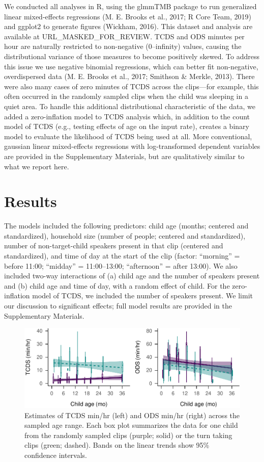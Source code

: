 \documentclass[,man,floatsintext]{apa6}
\begin{document}
We conducted all analyses in R, using the glmmTMB package to run
generalized linear mixed-effects regressions (M. E. Brooks et al., 2017;
R Core Team, 2019) and ggplot2 to generate figures (Wickham, 2016). This
dataset and analysis are available at URL\_MASKED\_FOR\_REVIEW. TCDS and
ODS minutes per hour are naturally restricted to non-negative
(0--infinity) values, causing the distributional variance of those
measures to become positively skewed. To address this issue we use
negative binomial regressions, which can better fit non-negative,
overdispersed data (M. E. Brooks et al., 2017; Smithson \& Merkle,
2013). There were also many cases of zero minutes of TCDS across the
clips---for example, this often occurred in the randomly sampled clips
when the child was sleeping in a quiet area. To handle this additional
distributional characteristic of the data, we added a zero-inflation
model to TCDS analysis which, in addition to the count model of TCDS
(e.g., testing effects of age on the input rate), creates a binary model
to evaluate the likelihood of TCDS being used at all. More conventional,
gaussian linear mixed-effects regressions with log-transformed dependent
variables are provided in the Supplementary Materials, but are
qualitatively similar to what we report here.

\section{Results}\label{results}

The models included the following predictors: child age (months;
centered and standardized), household size (number of people; centered
and standardized), number of non-target-child speakers present in that
clip (centered and standardized), and time of day at the start of the
clip (factor: \enquote{morning} = before 11:00; \enquote{midday} =
11:00--13:00; \enquote{afternoon} = after 13:00). We also included
two-way interactions of (a) child age and the number of speakers present
and (b) child age and time of day, with a random effect of child. For
the zero-inflation model of TCDS, we included the number of speakers
present. We limit our discussion to significant effects; full model
results are provided in the Supplementary Materials.

\begin{figure}
\centering
\includegraphics{Yeli-CLE_files/figure-latex/fig2-1.pdf}
\caption{\label{fig:fig2}Estimates of TCDS min/hr (left) and ODS min/hr
(right) across the sampled age range. Each box plot summarizes the data
for one child from the randomly sampled clips (purple; solid) or the
turn taking clips (green; dashed). Bands on the linear trends show 95\%
confidence intervals.}
\end{figure}
\end{document}
